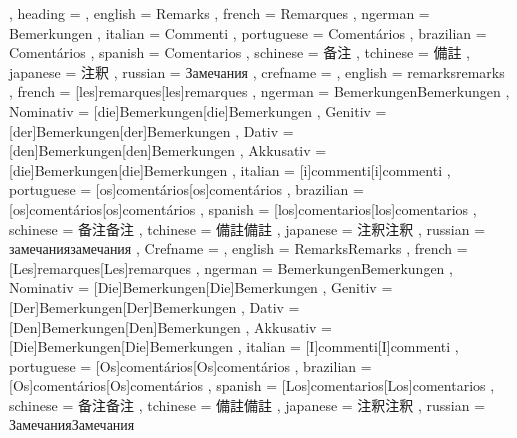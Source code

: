   {
    , heading =   {
                    , english     = Remarks
                    , french      = Remarques
                    , ngerman     = Bemerkungen
                    , italian     = Commenti
                    , portuguese  = Comentários
                    , brazilian   = Comentários
                    , spanish     = Comentarios
                    , schinese    = 备注
                    , tchinese    = 備註
                    , japanese    = 注釈
                    , russian     = Замечания
                  }
    , crefname =  {
                    , english     = {remarks}{remarks}
                    , french      = [les]{remarques}[les]{remarques}
                    , ngerman     = { {Bemerkungen}{Bemerkungen}
                                      , Nominativ = [die]{Bemerkungen}[die]{Bemerkungen}
                                      , Genitiv   = [der]{Bemerkungen}[der]{Bemerkungen}
                                      , Dativ     = [den]{Bemerkungen}[den]{Bemerkungen}
                                      , Akkusativ = [die]{Bemerkungen}[die]{Bemerkungen}
                                    }
                    , italian     = [i]{commenti}[i]{commenti}
                    , portuguese  = [os]{comentários}[os]{comentários}
                    , brazilian   = [os]{comentários}[os]{comentários}
                    , spanish     = [los]{comentarios}[los]{comentarios}
                    , schinese    = {备注}{备注}
                    , tchinese    = {備註}{備註}
                    , japanese    = {注釈}{注釈}
                    , russian     = {замечания}{замечания}
                  }
    , Crefname =  {
                    , english     = {Remarks}{Remarks}
                    , french      = [Les]{remarques}[Les]{remarques}
                    , ngerman     = { {Bemerkungen}{Bemerkungen}
                                      , Nominativ = [Die]{Bemerkungen}[Die]{Bemerkungen}
                                      , Genitiv   = [Der]{Bemerkungen}[Der]{Bemerkungen}
                                      , Dativ     = [Den]{Bemerkungen}[Den]{Bemerkungen}
                                      , Akkusativ = [Die]{Bemerkungen}[Die]{Bemerkungen}
                                    }
                    , italian     = [I]{commenti}[I]{commenti}
                    , portuguese  = [Os]{comentários}[Os]{comentários}
                    , brazilian   = [Os]{comentários}[Os]{comentários}
                    , spanish     = [Los]{comentarios}[Los]{comentarios}
                    , schinese    = {备注}{备注}
                    , tchinese    = {備註}{備註}
                    , japanese    = {注釈}{注釈}
                    , russian     = {Замечания}{Замечания}
                  }
  }

